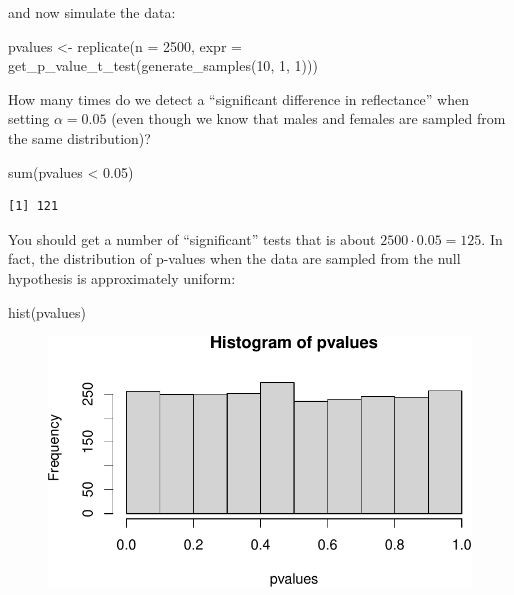 \documentclass[
  letterpaper,
  DIV=11,
  numbers=noendperiod]{scrreprt}
\newenvironment{Shaded}{\begin{snugshade}}{\end{snugshade}}
\newcommand{\AttributeTok}[1]{\textcolor[rgb]{0.40,0.45,0.13}{#1}}
\newcommand{\DecValTok}[1]{\textcolor[rgb]{0.68,0.00,0.00}{#1}}
\newcommand{\FloatTok}[1]{\textcolor[rgb]{0.68,0.00,0.00}{#1}}
\newcommand{\FunctionTok}[1]{\textcolor[rgb]{0.28,0.35,0.67}{#1}}
\newcommand{\NormalTok}[1]{\textcolor[rgb]{0.00,0.23,0.31}{#1}}
\newcommand{\OtherTok}[1]{\textcolor[rgb]{0.00,0.23,0.31}{#1}}
\newcommand{\SpecialCharTok}[1]{\textcolor[rgb]{0.37,0.37,0.37}{#1}}
\begin{document}
and now simulate the data:

\begin{Shaded}
\begin{Highlighting}[]
\NormalTok{pvalues }\OtherTok{\textless{}{-}} \FunctionTok{replicate}\NormalTok{(}\AttributeTok{n =} \DecValTok{2500}\NormalTok{, }
                     \AttributeTok{expr =} \FunctionTok{get\_p\_value\_t\_test}\NormalTok{(}\FunctionTok{generate\_samples}\NormalTok{(}\DecValTok{10}\NormalTok{, }\DecValTok{1}\NormalTok{, }\DecValTok{1}\NormalTok{)))}
\end{Highlighting}
\end{Shaded}

How many times do we detect a ``significant difference in reflectance''
when setting \(\alpha = 0.05\) (even though we know that males and
females are sampled from the same distribution)?

\begin{Shaded}
\begin{Highlighting}[]
\FunctionTok{sum}\NormalTok{(pvalues }\SpecialCharTok{\textless{}} \FloatTok{0.05}\NormalTok{)}
\end{Highlighting}
\end{Shaded}

\begin{verbatim}
[1] 121
\end{verbatim}

You should get a number of ``significant'' tests that is about
\(2500 \cdot 0.05 = 125\). In fact, the distribution of p-values when
the data are sampled from the null hypothesis is approximately uniform:

\begin{Shaded}
\begin{Highlighting}[]
\FunctionTok{hist}\NormalTok{(pvalues)}
\end{Highlighting}
\end{Shaded}

\begin{figure}[H]

{\centering \includegraphics{./05-hypothesis_files/figure-pdf/unnamed-chunk-8-1.pdf}

}

\end{figure}
\end{document}
